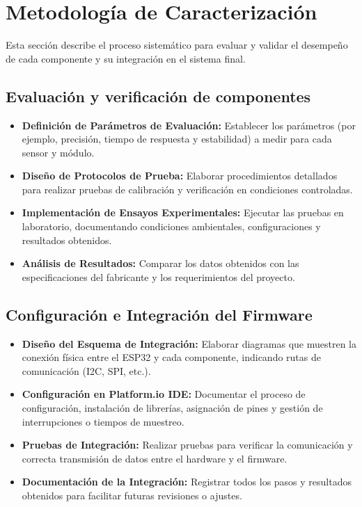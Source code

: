 \section{Metodología de Caracterización}
Esta sección describe el proceso sistemático para evaluar y validar el desempeño de cada componente y su integración en el sistema final.

\subsection{Evaluación y verificación de componentes}
\begin{itemize}
    \item \textbf{Definición de Parámetros de Evaluación:} Establecer los parámetros (por ejemplo, precisión, tiempo de respuesta y estabilidad) a medir para cada sensor y módulo.
    \item \textbf{Diseño de Protocolos de Prueba:} Elaborar procedimientos detallados para realizar pruebas de calibración y verificación en condiciones controladas.
    \item \textbf{Implementación de Ensayos Experimentales:} Ejecutar las pruebas en laboratorio, documentando condiciones ambientales, configuraciones y resultados obtenidos.
    \item \textbf{Análisis de Resultados:} Comparar los datos obtenidos con las especificaciones del fabricante y los requerimientos del proyecto.
\end{itemize}

\subsection{Configuración e Integración del Firmware}
\begin{itemize}
    \item \textbf{Diseño del Esquema de Integración:} Elaborar diagramas que muestren la conexión física entre el ESP32 y cada componente, indicando rutas de comunicación (I2C, SPI, etc.).
    \item \textbf{Configuración en Platform.io IDE:} Documentar el proceso de configuración, instalación de librerías, asignación de pines y gestión de interrupciones o tiempos de muestreo.
    \item \textbf{Pruebas de Integración:} Realizar pruebas para verificar la comunicación y correcta transmisión de datos entre el hardware y el firmware.
    \item \textbf{Documentación de la Integración:} Registrar todos los pasos y resultados obtenidos para facilitar futuras revisiones o ajustes.
\end{itemize}

